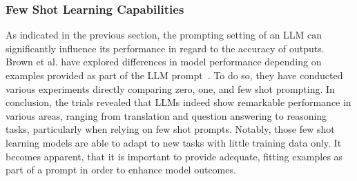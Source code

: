 
\subsubsection{Few Shot Learning Capabilities}
As indicated in the previous section, the prompting setting of an LLM can significantly influence its
performance in regard to the accuracy of outputs.
Brown et al\(.\) have explored differences
in model performance depending on examples provided as part of the LLM prompt~\cite{brown_language_2020}.
To do so, they have conducted various experiments directly comparing zero, one, and few shot
prompting.
In conclusion, the trials revealed that LLMs indeed show remarkable performance in various areas,
ranging from translation and question answering to reasoning tasks, particularly when relying on
few shot prompts.
Notably, those few shot learning models are able to adapt to new tasks with little training data
only.
It becomes apparent, that it is important to provide adequate, fitting examples as part of a
prompt in order to enhance model outcomes.

